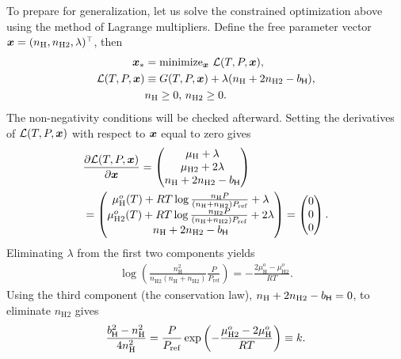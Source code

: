 To prepare for generalization, let us solve the constrained optimization above using the method of Lagrange multipliers. Define the free parameter vector $\boldsymbol{x} = ( n_\mathrm{H},  n_\mathrm{H2}, \lambda )^\top$, then
\begin{align}
\label{eq:opt2tce}
    \boldsymbol{x}_\ast &= \mathrm{minimize}_{\boldsymbol{x}} \,\, \mathcal{L} (T, P, \boldsymbol{x}), \\ 
    \mathcal{L} (T, P, \boldsymbol{x}) &\equiv G(T, P, \boldsymbol{x}) + \lambda (n_\mathrm{H}  + 2 n_\mathrm{H2} - b_{\mathsf{H}} ), \\
    \label{eq:nonnegative_tce}
    &n_\mathrm{H} \ge 0, \, n_\mathrm{H2} \ge 0.
\end{align}
The non-negativity conditions will be checked afterward. Setting the derivatives of $\mathcal{L} (T, P, \boldsymbol{x})$ with respect to $\boldsymbol{x}$ equal to zero gives
\begin{align}
&\frac{\partial \mathcal{L} (T, P, \boldsymbol{x})}{\partial \boldsymbol{x}} = 
\begin{pmatrix}
    \mu_\mathrm{H} + \lambda \\
    \mu_\mathrm{H2} + 2 \lambda \\
    n_\mathrm{H} + 2 n_\mathrm{H2} -  b_{\mathsf{H}} 
\end{pmatrix} \\
&=
\begin{pmatrix}
    \mu_\mathrm{H}^o(T) + RT \log{\frac{n_\mathrm{H} P}{(n_\mathrm{H} + n_\mathrm{H2}) P_\mathrm{ref}}}  + \lambda \\
    \mu_\mathrm{H2}^o(T) + RT\log{\frac{n_\mathrm{H2} P}{(n_\mathrm{H} + n_\mathrm{H2}) P_\mathrm{ref}}} + 2 \lambda \\
    n_\mathrm{H} + 2 n_\mathrm{H2} -  b_{\mathsf{H}} 
\end{pmatrix}
=
\begin{pmatrix}
    0 \\
    0 \\
    0
\end{pmatrix}.
\end{align}
Eliminating $\lambda$ from the first two components yields
\begin{align}
    \log{\left( \frac{n_\mathrm{H}^2 }{n_\mathrm{H2} (n_\mathrm{H} + n_\mathrm{H2})} \frac{P}{P_\mathrm{ref}} \right)} =- \frac{2 \mu_\mathrm{H}^o - \mu_\mathrm{H2}^o}{RT}.
\end{align}
Using the third component (the conservation law), $n_\mathrm{H} + 2 n_\mathrm{H2} - b_{\mathsf{H}}=0$, to eliminate $n_\mathrm{H2}$ gives
\begin{align}
\frac{ b_{\mathsf{H}}^2 - n_\mathrm{H}^2}{4 n_\mathrm{H}^2} = \frac{P}{P_\mathrm{ref}} 
\exp{\left( - \frac{\mu_\mathrm{H2}^o - 2 \mu_\mathrm{H}^o}{RT} \right)}  \equiv k.
\end{align}
